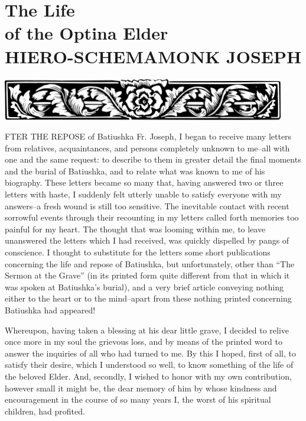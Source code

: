 \part{The Life\\of the Optina Elder\\HIERO-SCHEMAMONK JOSEPH}

\newpage
\begin{center}
	\includegraphics[width=\the\textwidth]{./Images/Chapter_Banner.png}\\
	\vspace{1.5cm}
\end{center}
FTER THE REPOSE of Batiushka Fr. Joseph, I began to receive many letters from relatives, acquaintances, and persons completely unknown to me--all with one and the same request: to describe to them in greater detail the final moments and the burial of Batiushka, and to relate what was known to me of his biography. These letters became so many that, having answered two or three letters with haste, I suddenly felt utterly unable to satisfy everyone with my answers--a fresh wound is still too sensitive. The inevitable contact with recent sorrowful events through their recounting in my letters called forth memories too painful for my heart. The thought that was looming within me, to leave unanswered the letters which I had received, was quickly dispelled by pangs of conscience. I thought to substitute for the letters some short publications concerning the life and repose of Batiushka, but unfortunately, other than “The Sermon at the Grave” (in its printed form quite different from that in which it was spoken at Batiushka's burial), and a very brief article conveying nothing either to the heart or to the mind--apart from these nothing printed concerning Batiushka had appeared!

Whereupon, having taken a blessing at his dear little grave, I decided to relive once more in my soul the grievous loss, and by means of the printed word to answer the inquiries of all who had turned to me. By this I hoped, first of all, to satisfy their desire, which I understood so well, to know something of the life of the beloved Elder. And, secondly, I wished to honor with my own contribution, however small it might be, the dear memory of him by whose kindness and encouragement in the course of so many years I, the worst of his spiritual children, had profited.


